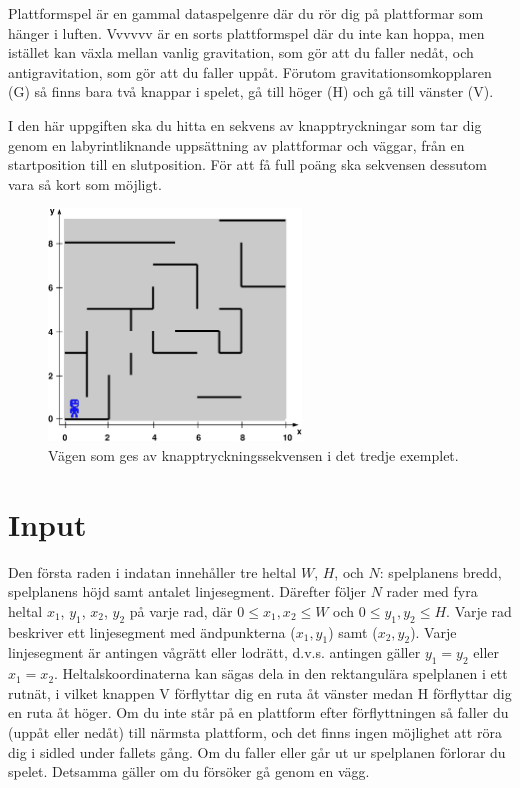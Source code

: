 Plattformspel är en gammal dataspelgenre där du rör dig på plattformar som hänger i luften. Vvvvvv är en sorts plattformspel där du inte kan hoppa, men istället kan växla mellan vanlig gravitation, som gör att du faller nedåt, och antigravitation, som gör att du faller uppåt. Förutom gravitationsomkopplaren (G) så finns bara två knappar i spelet, gå till höger (H) och gå till vänster (V).

I den här uppgiften ska du hitta en sekvens av knapptryckningar som tar dig genom en labyrintliknande uppsättning av plattformar och väggar, från en startposition till en slutposition. För att få full poäng ska sekvensen dessutom vara så kort som möjligt.

\begin{figure}[ht!]
\centering
\includegraphics[width=0.6\textwidth]{spelplan.pdf}
\caption{Vägen som ges av knapptryckningssekvensen i det tredje exemplet.}
\label{overflow}
\end{figure}


\section*{Input}
Den första raden i indatan innehåller tre heltal $W$, $H$, och $N$: spelplanens bredd, spelplanens höjd samt antalet linjesegment. Därefter följer $N$ rader med fyra heltal $x_1$, $y_1$, $x_2$, $y_2$ på varje rad, där $0 \le x_1,x_2 \le W$ och $0 \le y_1,y_2 \le H$. Varje rad beskriver ett linjesegment med ändpunkterna ($x_1, y_1$) samt ($x_2, y_2$). Varje linjesegment är antingen vågrätt eller lodrätt, d.v.s. antingen gäller $y_1=y_2$ eller $x_1=x_2$. Heltalskoordinaterna kan sägas dela in den rektangulära spelplanen i ett rutnät, i vilket knappen V förflyttar dig en ruta åt vänster medan H förflyttar dig en ruta åt höger. Om du inte står på en plattform efter förflyttningen så faller du (uppåt eller nedåt) till närmsta plattform, och det finns ingen möjlighet att röra dig i sidled under fallets gång. Om du faller eller går ut ur spelplanen förlorar du spelet. Detsamma gäller om du försöker gå genom en vägg.

